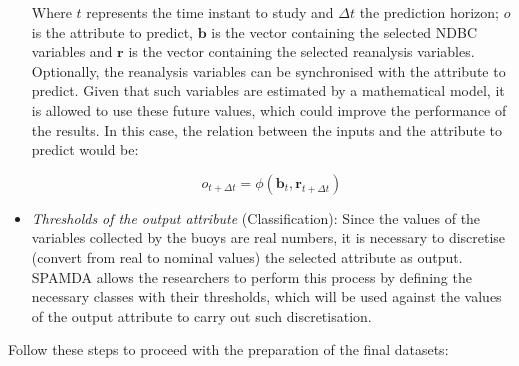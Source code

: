 \begin{onehalfspace}
\begin{itemize}
						Where $t$ represents the time instant to study and $\Delta t$ the prediction horizon; $o$ is the attribute to predict, $\mathbf{b}$ is the vector containing the selected NDBC variables and $\mathbf{r}$ is the vector containing the selected reanalysis variables. Optionally, the reanalysis variables can be synchronised with the attribute to predict. Given that such variables are estimated by a mathematical model, it is allowed to use these future values, which could improve the performance of the results. In this case, the relation between the inputs and the attribute to predict would be:
						
							\begin{linenomath*}
								\begin{equation}
									o_{t+\Delta t}=\phi(\mathbf{b}_t,\mathbf{r}_{t+\Delta t})
								\end{equation}
							\end{linenomath*}
						
						\item \textit{Thresholds of the output attribute} (Classification): Since the values of the variables collected by the buoys are real numbers, it is necessary to discretise (convert from real to nominal values) the selected attribute as output. SPAMDA allows the researchers to perform this process by defining the necessary classes with their thresholds, which will be used against the values of the output attribute to carry out such discretisation.
					\end{itemize}
					
				Follow these steps to proceed with the preparation of the final datasets:
				


\end{onehalfspace}
